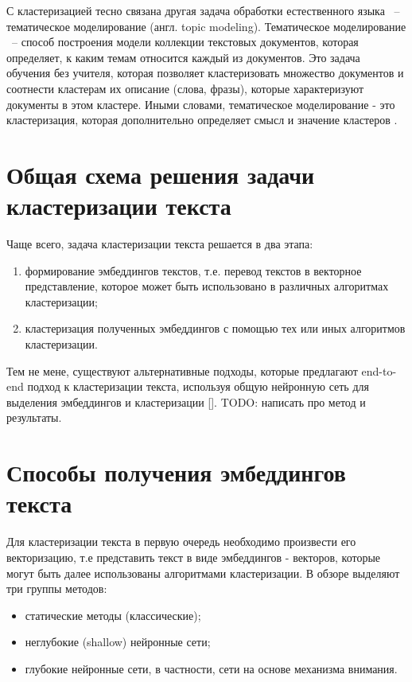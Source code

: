С кластеризацией тесно связана другая задача обработки естественного языка ~-- тематическое моделирование (англ. topic modeling). Тематическое моделирование ~-- способ построения модели коллекции текстовых документов, которая определяет, к каким темам относится каждый из документов. Это задача обучения без учителя, которая позволяет кластеризовать множество документов и соотнести кластерам их описание (слова, фразы), которые характеризуют документы в этом кластере. Иными словами, тематическое моделирование - это кластеризация, которая дополнительно определяет смысл и значение кластеров \cite{no-patterns}.

\section{Общая схема решения задачи кластеризации текста}

Чаще всего, задача кластеризации текста решается в два этапа:
\begin{enumerate}
    \item формирование эмбеддингов текстов, т.е. перевод текстов в векторное представление, которое может быть использовано в различных алгоритмах кластеризации;
    \item кластеризация полученных эмбеддингов с помощью тех или иных алгоритмов кластеризации.
\end{enumerate}

Тем не мене, существуют альтернативные подходы, которые предлагают end-to-end подход к кластеризации текста, используя общую нейронную сеть для выделения эмбеддингов и кластеризации [\cite{end-to-end-clustering}]. TODO: написать про метод и результаты.

\section{Способы получения эмбеддингов текста}

Для кластеризации текста в первую очередь необходимо произвести его векторизацию, т.е представить текст в виде эмбеддингов - векторов, которые могут быть далее использованы алгоритмами кластеризации. В обзоре \cite{no-patterns} выделяют три группы методов:
\begin{itemize}
    \item статические методы (классические);
    \item неглубокие (shallow) нейронные сети;
    \item глубокие нейронные сети, в частности, сети на основе механизма внимания.
\end{itemize}

